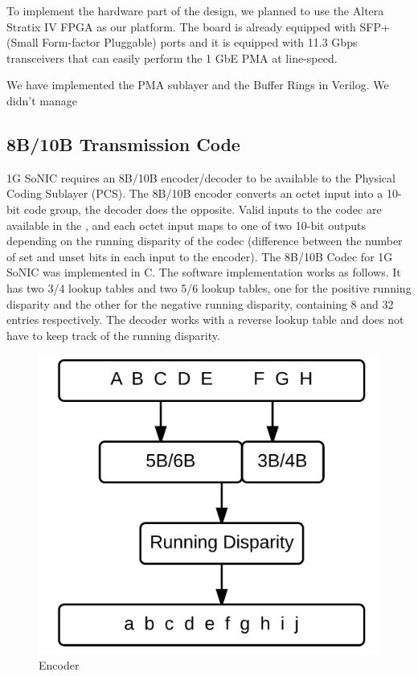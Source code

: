 \documentclass[conference]{IEEEtran}
\begin{document}
To implement the hardware part of the design, we planned to use the Altera Stratix IV FPGA as our platform. The board is already equipped with SFP+ (Small Form-factor Pluggable) ports and it is equipped with 11.3 Gbps transceivers that can easily perform the 1 GbE PMA at line-speed.

We have implemented the PMA sublayer and the Buffer Rings in Verilog. We didn't manage 

\subsection{8B/10B Transmission Code}

1G SoNIC requires an 8B/10B encoder/decoder to be available to the Physical Coding Sublayer (PCS). The 8B/10B encoder converts an octet input into a 10-bit code group, the decoder does the opposite. Valid inputs to the codec are available in the \cite{ieeestandard}, and each octet input maps to one of two 10-bit outputs depending on the running disparity of the codec (difference between the number of set and unset bits in each input to the encoder). The 8B/10B Codec for 1G SoNIC was implemented in C. The software implementation works as follows. It has two 3/4 lookup tables and two 5/6 lookup tables, one for the positive running disparity and the other for the negative running disparity, containing 8 and 32 entries respectively. The decoder works with a reverse lookup table and does not have to keep track of the running disparity.

\begin{figure}[t]
  \centering
  \includegraphics[scale=0.3]{images/encoder}
  \caption{Encoder}
  \label{fig:encoder}
\end{figure}
\end{document}
